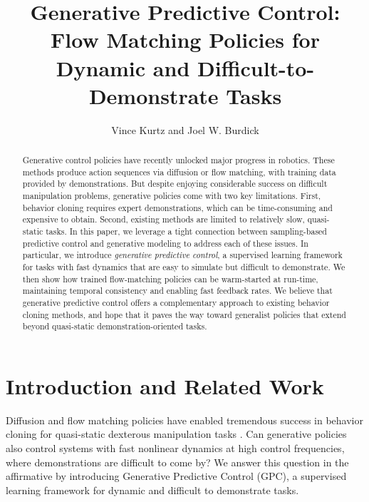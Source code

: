 \documentclass[letterpaper, 10 pt]{ieeeconf}
\begin{document}
\title{\LARGE \bf Generative Predictive Control:\\ Flow Matching Policies for Dynamic and Difficult-to-Demonstrate Tasks}

\author{Vince Kurtz and Joel W. Burdick}

\maketitle
\thispagestyle{empty}

\begin{abstract}
    Generative control policies have recently unlocked major progress in robotics. These methods produce action sequences via diffusion or flow matching, with training data provided by demonstrations. But despite enjoying considerable success on difficult manipulation problems, generative policies come with two key limitations. First, behavior cloning requires expert demonstrations, which can be time-consuming and expensive to obtain. Second, existing methods are limited to relatively slow, quasi-static tasks. In this paper, we leverage a tight connection between sampling-based predictive control and generative modeling to address each of these issues. In particular, we introduce \textit{generative predictive control}, a supervised learning framework for tasks with fast dynamics that are easy to simulate but difficult to demonstrate. We then show how trained flow-matching policies can be warm-started at run-time, maintaining temporal consistency and enabling fast feedback rates. We believe that generative predictive control offers a complementary approach to existing behavior cloning methods, and hope that it paves the way toward generalist policies that extend beyond quasi-static demonstration-oriented tasks.
\end{abstract}

\section{Introduction and Related Work}\label{sec:intro}

Diffusion and flow matching policies have enabled tremendous success in behavior cloning for quasi-static dexterous manipulation tasks \cite{chi2023diffusion, black2024pi_0, zhao2023learning, fu2024mobile}. Can generative policies also control systems with fast nonlinear dynamics at high control frequencies, where demonstrations are difficult to come by? We answer this question in the affirmative by introducing Generative Predictive Control (GPC), a supervised learning framework for dynamic and difficult to demonstrate tasks. 
\end{document}
